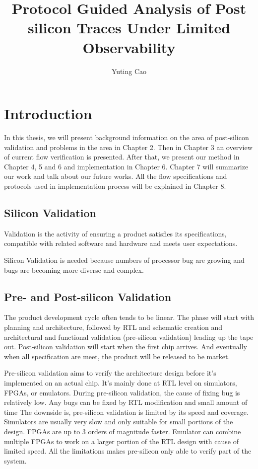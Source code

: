 \documentclass[12pt,frontmatter,copyright,thesis]{usfmanus}
\title{Protocol Guided Analysis of Post silicon Traces Under Limited Observability}
\author{Yuting Cao}
\begin{document}
\chapter{Introduction}

In this thesis, we will present background information on the area of post-silicon validation and problems in the area in Chapter 2. Then in Chapter 3 an overview of current flow verification is presented. After that, we present our method in Chapter 4, 5 and 6 and implementation in Chapter 6. Chapter 7 will summarize our work and talk about our future works. All the flow specifications and protocols used in implementation process will be explained in Chapter 8.
\section{Silicon Validation}
Validation is the activity of ensuring a product satisfies its specifications, compatible with related software and hardware and meets user expectations. ~\cite{validationWall}

Silicon Validation is needed because numbers of processor bug are growing and bugs are becoming more diverse and complex.

 \section{Pre- and Post-silicon Validation}


The product development cycle often tends to be linear. The phase will start with planning and architecture, followed by RTL and schematic creation and architectural and functional validation (pre-silicon validation) leading up the tape out. Post-silicon validation will start when the first chip arrives. And eventually when all specification are meet, the product will be released to be market. ~\cite{validationWall}

Pre-silicon validation aims to verify the architecture design before 
it's implemented on an actual chip. It's mainly done at RTL level on simulators, FPGAs, or emulators. 
During pre-silicon validation, the cause of fixing bug is relatively low. 
Any bugs can be fixed by RTL modification and small amount of time
The downside is, pre-silicon validation is limited by its speed and coverage. 
Simulators are usually very slow and only suitable for small portions
of the design. FPGAs are up to 3 orders of magnitude faster. Emulator can combine multiple FPGAs
to work on a larger portion of the RTL design with cause of limited speed. All the limitations makes
pre-silicon only able to verify part of the system. 
\end{document}
